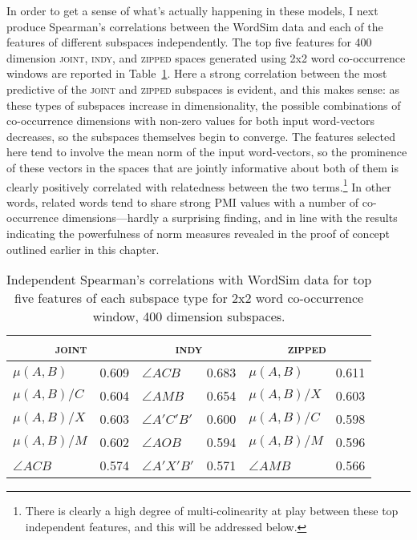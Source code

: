In order to get a sense of what's actually happening in these models, I next produce Spearman's correlations between the WordSim data and each of the features of different subspaces independently.  The top five features for 400 dimension \textsc{joint}, \textsc{indy}, and \textsc{zipped} spaces generated using 2x2 word co-occurrence windows are reported in Table~\ref{tab:ind-related}.  Here a strong correlation between the most predictive of the \textsc{joint} and \textsc{zipped} subspaces is evident, and this makes sense: as these types of subspaces increase in dimensionality, the possible combinations of co-occurrence dimensions with non-zero values for both input word-vectors decreases, so the subspaces themselves begin to converge.  The features selected here tend to involve the mean norm of the input word-vectors, so the prominence of these vectors in the spaces that are jointly informative about both of them is clearly positively correlated with relatedness between the two terms.\footnote{There is clearly a high degree of multi-colinearity at play between these top independent features, and this will be addressed below.}  In other words, related words tend to share strong PMI values with a number of co-occurrence dimensions---hardly a surprising finding, and in line with the results indicating the powerfulness of norm measures revealed in the proof of concept outlined earlier in this chapter.

\begin{table}
\centering
\begin{tabular}{lr|lr|lr}
\hline
\multicolumn{2}{c}{\textsc{joint}} & \multicolumn{2}{c}{\textsc{indy}} & \multicolumn{2}{c}{\textsc{zipped}} \\
\hline
$\mu (A,B)$ & 0.609 & $\angle ACB$ & 0.683 & $\mu (A,B)$ & 0.611 \\
$\mu (A,B)/C$ & 0.604 & $\angle AMB$ & 0.654 & $\mu (A,B)/X$ & 0.603 \\
$\mu (A,B)/X$ & 0.603 & $\angle A'C'B'$ & 0.600 & $\mu (A,B)/C$ & 0.598 \\
$\mu (A,B)/M$ & 0.602 & $\angle AOB$ & 0.594 & $\mu (A,B)/M$ & 0.596 \\
$\angle ACB$ & 0.574 & $\angle A'X'B'$ & 0.571 & $\angle AMB$ & 0.566 \\
\hline
\end{tabular}
\caption{Independent Spearman's correlations with WordSim data for top five features of each subspace type for 2x2 word co-occurrence window, 400 dimension subspaces.}
\label{tab:ind-related}
\end{table}

